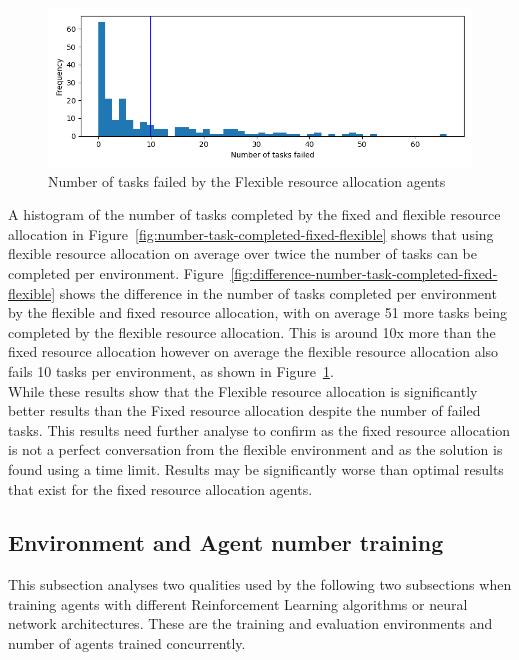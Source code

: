 \begin{figure}[H]
    \centering
    \includegraphics[width=\textwidth]{figures/5_evaluation_figs/flexible_failed_tasks.png}
    \caption{Number of tasks failed by the Flexible resource allocation agents}
    \label{fig:flexibe-failed-tasks}
\end{figure}

A histogram of the number of tasks completed by the fixed and flexible resource allocation in
Figure~\ref{fig:number-task-completed-fixed-flexible} shows that using flexible resource allocation on average
over twice the number of tasks can be completed per environment.
Figure~\ref{fig:difference-number-task-completed-fixed-flexible} shows the difference in the number of tasks completed
per environment by the flexible and fixed resource allocation, with on average 51 more tasks being completed by the
flexible resource allocation. This is around 10x more than the fixed resource allocation however on average the flexible
resource allocation also fails 10 tasks per environment, as shown in Figure~\ref{fig:flexibe-failed-tasks}. \\
While these results show that the Flexible resource allocation is significantly better results than the Fixed resource
allocation despite the number of failed tasks. This results need further analyse to confirm as the fixed resource
allocation is not a perfect conversation from the flexible environment and as the solution is found using a time
limit. Results may be significantly worse than optimal results that exist for the fixed resource allocation agents.

\subsection{Environment and Agent number training}
\label{subsec:environment-and-agent-number-training}
This subsection analyses two qualities used by the following two subsections when training agents with different
Reinforcement Learning algorithms or neural network architectures. These are the training and evaluation environments
and number of agents trained concurrently.

